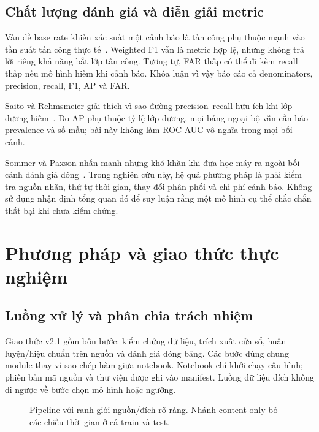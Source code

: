 \documentclass[12pt,a4paper,oneside,openany]{extbook}
\begin{document}
\section{Chất lượng đánh giá và diễn giải metric}
Vấn đề base rate khiến xác suất một cảnh báo là tấn công phụ thuộc mạnh vào tần suất tấn công thực tế~\cite{axelsson2000base}. Weighted F1 vẫn là metric hợp lệ, nhưng không trả lời riêng khả năng bắt lớp tấn công. Tương tự, FAR thấp có thể đi kèm recall thấp nếu mô hình hiếm khi cảnh báo. Khóa luận vì vậy báo cáo cả denominators, precision, recall, F1, AP và FAR.

Saito và Rehmsmeier giải thích vì sao đường precision--recall hữu ích khi lớp dương hiếm~\cite{saito2015pr}. Do AP phụ thuộc tỷ lệ lớp dương, mọi bảng ngoại bộ vẫn cần báo prevalence và số mẫu; bài này không làm ROC-AUC vô nghĩa trong mọi bối cảnh.

Sommer và Paxson nhấn mạnh những khó khăn khi đưa học máy ra ngoài bối cảnh đánh giá đóng~\cite{sommer2010outside}. Trong nghiên cứu này, hệ quả phương pháp là phải kiểm tra nguồn nhãn, thứ tự thời gian, thay đổi phân phối và chi phí cảnh báo. Không sử dụng nhận định tổng quan đó để suy luận rằng một mô hình cụ thể chắc chắn thất bại khi chưa kiểm chứng.

\chapter{Phương pháp và giao thức thực nghiệm}\label{chap:method}
\section{Luồng xử lý và phân chia trách nhiệm}
Giao thức v2.1 gồm bốn bước: kiểm chứng dữ liệu, trích xuất cửa sổ, huấn luyện/hiệu chuẩn trên nguồn và đánh giá đóng băng. Các bước dùng chung module thay vì sao chép hàm giữa notebook. Notebook chỉ khởi chạy cấu hình; phiên bản mã nguồn và thư viện được ghi vào manifest. Luồng dữ liệu đích không đi ngược về bước chọn mô hình hoặc ngưỡng.

\begin{figure}[htbp]\centering
{}
\caption{Pipeline với ranh giới nguồn/đích rõ ràng. Nhánh content-only bỏ các chiều thời gian ở cả train và test.}\label{fig:pipeline}
\end{figure}
\end{document}
